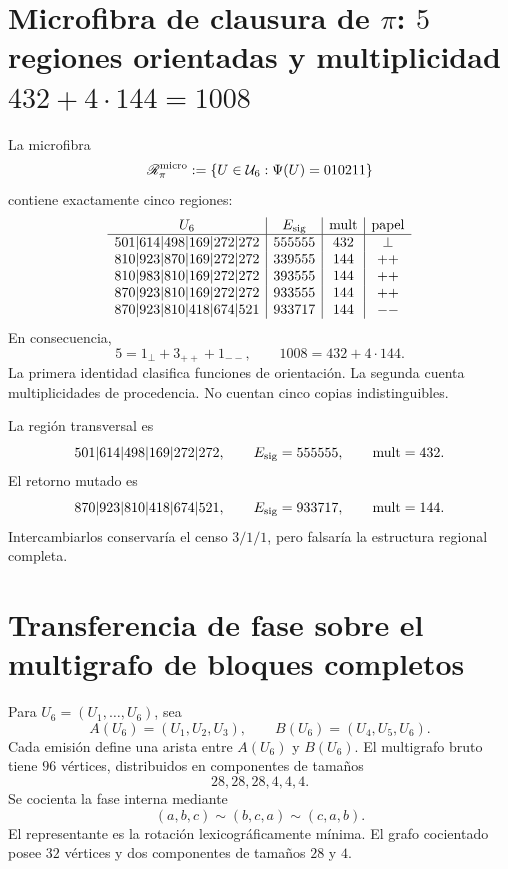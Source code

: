 \section{Microfibra de clausura de \(\pi\): \(5\) regiones orientadas y multiplicidad \(432+4\cdot144=1008\)}

La microfibra
\[
 \mathscr R_\pi^{\rm micro}
 :=\{U\in\mathcal U_6:\Psi(U)=010211\}
\]
contiene exactamente cinco regiones:
\[
\begin{array}{c|c|c|c}
U_6&E_{\rm sig}&\operatorname{mult}&\text{papel}\\ \hline
501|614|498|169|272|272&555555&432&\perp\\
810|923|870|169|272|272&339555&144&++\\
810|983|810|169|272|272&393555&144&++\\
870|923|810|169|272|272&933555&144&++\\
870|923|810|418|674|521&933717&144&--
\end{array}
\]
En consecuencia,
\begin{equation}
 \boxed{
 5=1_\perp+3_{++}+1_{--},
 \qquad
 1008=432+4\cdot144.}
 \label{gfp:b:eq:descomposiciones-cinco-regiones-pi}
\end{equation}
La primera identidad clasifica funciones de orientación. La segunda cuenta
multiplicidades de procedencia. No cuentan cinco copias indistinguibles.

La región transversal es
\[
 501|614|498|169|272|272,
 \qquad E_{\rm sig}=555555,
 \qquad\operatorname{mult}=432.
\]
El retorno mutado es
\[
 870|923|810|418|674|521,
 \qquad E_{\rm sig}=933717,
 \qquad\operatorname{mult}=144.
\]
Intercambiarlos conservaría el censo \(3/1/1\), pero falsaría la estructura
regional completa.

\section{Transferencia de fase sobre el multigrafo de bloques completos}

Para \(U_6=(U_1,\ldots,U_6)\), sea
\[
 A(U_6)=(U_1,U_2,U_3),
 \qquad
 B(U_6)=(U_4,U_5,U_6).
\]
Cada emisión define una arista entre \(A(U_6)\) y \(B(U_6)\). El multigrafo
bruto tiene \(96\) vértices, distribuidos en componentes de tamaños
\[
 28,28,28,4,4,4.
\]
Se cocienta la fase interna mediante
\[
 (a,b,c)\sim(b,c,a)\sim(c,a,b).
\]
El representante es la rotación lexicográficamente mínima. El grafo
cocientado posee \(32\) vértices y dos componentes de tamaños \(28\) y \(4\).

